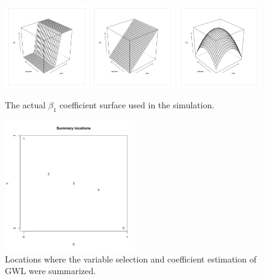 \documentclass[authoryear, review, 11pt]{elsarticle}
\begin{document}
	\begin{figure}
		\begin{center}
			\includegraphics[width=0.32\textwidth]{../../figures/simulation/step.pdf}
			\includegraphics[width=0.32\textwidth]{../../figures/simulation/gradient.pdf}
			\includegraphics[width=0.32\textwidth]{../../figures/simulation/parabola.pdf}
			\caption{The actual $\beta_1$ coefficient surface used in the simulation.\label{fig:sim-actual}}
		\end{center}
	\end{figure}
	
	\begin{figure}
		\begin{center}
			\includegraphics[width=0.5\textwidth]{../../figures/simulation/illustrations/summary-locations.pdf}
			\caption{Locations where the variable selection and coefficient estimation of GWL were summarized.\label{fig:summary-locations}}
		\end{center}
	\end{figure}
	
\end{document}
